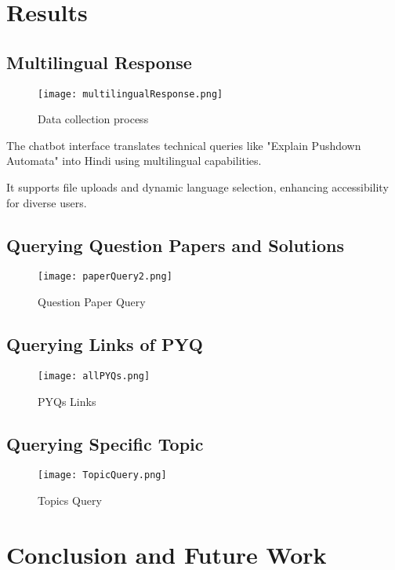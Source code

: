 \documentclass[12pt]{report}
\begin{document}
\chapter{Results}
\section{Multilingual Response}

\begin{figure}[h]
\centering
\texttt{[image: multilingualResponse.png]}
\caption{Data collection process}
\label{fig:data-collection}
\end{figure}




The chatbot interface translates technical queries like "Explain Pushdown Automata" into Hindi using multilingual capabilities. 

It supports file uploads and dynamic language selection, enhancing accessibility for diverse users.


\newpage

\section{Querying Question Papers and Solutions}
\begin{figure}[h]
\centering
\texttt{[image: paperQuery2.png]}
\caption{Question Paper Query}
\label{fig:data-collection}
\end{figure}


\section{Querying Links of PYQ}
\begin{figure}[h]
\centering
\texttt{[image: allPYQs.png]}
\caption{PYQs Links}
\label{fig:data-collection}
\end{figure}

\newpage
\section{Querying Specific Topic}
\begin{figure}[h]
\centering
\texttt{[image: TopicQuery.png]}
\caption{Topics Query}
\label{fig:data-collection}
\end{figure}


\chapter{Conclusion and Future Work}
\end{document}
